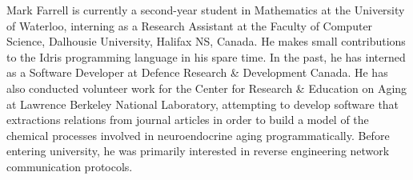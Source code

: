 Mark Farrell is currently a second-year student in Mathematics at the University of Waterloo, interning as a Research Assistant at the Faculty of Computer Science, Dalhousie University, Halifax NS, Canada.
He makes small contributions to the Idris programming language in his spare time. In the past, he has interned as a Software Developer at Defence Research \& Development Canada. He has also conducted volunteer
work for the Center for Research \& Education on Aging at Lawrence Berkeley National Laboratory, attempting to develop software that extractions relations from journal articles in order to build a model of the chemical processes
involved in neuroendocrine aging programmatically. Before entering university, he was primarily interested in reverse engineering network communication protocols.
